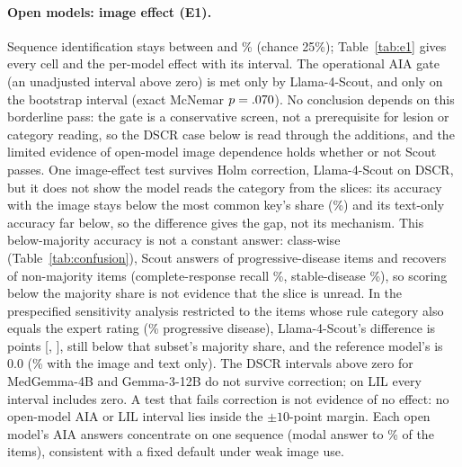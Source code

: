 \documentclass[conference]{IEEEtran}
\begin{document}
\paragraph{Open models: image effect (E1).} Sequence identification stays between \vfourEoneOwnAIAGemmaTwelve{} and \vfourEoneOwnAIAScout{}\% (chance 25\%); Table~\ref{tab:e1} gives every cell and the per-model effect with its interval. The operational AIA gate (an unadjusted interval above zero) is met only by Llama-4-Scout, and only on the bootstrap interval (exact McNemar $p=.070{}$). No conclusion depends on this borderline pass: the gate is a conservative screen, not a prerequisite for lesion or category reading, so the DSCR case below is read through the additions, and the limited evidence of open-model image dependence holds whether or not Scout passes. One image-effect test survives Holm correction, Llama-4-Scout on DSCR, but it does not show the model reads the category from the slices: its accuracy with the image stays below the most common key's share (\vfourMajorityDSCR{}\%) and its text-only accuracy far below, so the difference gives the gap, not its mechanism. This below-majority accuracy is not a constant answer: class-wise (Table~\ref{tab:confusion}), Scout answers \vfourConfOnMajority{} of \vfourConfOnMajorityN{} progressive-disease items and recovers \vfourConfOffMajority{} of \vfourConfOffMajorityN{} non-majority items (complete-response recall \vfourConfRecallCR{}\%, stable-disease \vfourConfRecallSD{}\%), so scoring below the majority share is not evidence that the slice is unread. In the prespecified sensitivity analysis restricted to the \vfourSensSubN{} items whose rule category also equals the expert rating (\vfourSensSubMajPct{}\% progressive disease), Llama-4-Scout's difference is \vfourSensSubDiffScout{} points [\vfourSensSubLoScout{}, \vfourSensSubHiScout{}], still below that subset's majority share, and the reference model's is 0.0 (\vfourSensSubRefAcc{}\% with the image and text only). The DSCR intervals above zero for MedGemma-4B and Gemma-3-12B do not survive correction; on LIL every interval includes zero. A test that fails correction is not evidence of no effect: no open-model AIA or LIL interval lies inside the $\pm10$-point margin. Each open model's AIA answers concentrate on one sequence (modal answer \vfourAiaModalShareLo{} to \vfourAiaModalShareHi{}\% of the \vfourNAIA{} items), consistent with a fixed default under weak image use.
\end{document}
